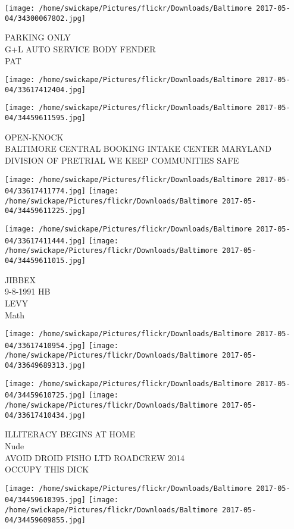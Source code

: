 \documentclass[10pt,letterpaper]{article}
\begin{document}
\vspace{0.25in}
\texttt{[image: /home/swickape/Pictures/flickr/Downloads/Baltimore 2017-05-04/34300067802.jpg]}

PARKING ONLY\\
G+L AUTO SERVICE BODY FENDER\\
PAT
\pagebreak

\texttt{[image: /home/swickape/Pictures/flickr/Downloads/Baltimore 2017-05-04/33617412404.jpg]}

\vspace{0.25in}
\texttt{[image: /home/swickape/Pictures/flickr/Downloads/Baltimore 2017-05-04/34459611595.jpg]}

OPEN{-}KNOCK\\
BALTIMORE CENTRAL BOOKING INTAKE CENTER MARYLAND DIVISION OF PRETRIAL WE KEEP COMMUNITIES SAFE
\pagebreak

\texttt{[image: /home/swickape/Pictures/flickr/Downloads/Baltimore 2017-05-04/33617411774.jpg]}
\texttt{[image: /home/swickape/Pictures/flickr/Downloads/Baltimore 2017-05-04/34459611225.jpg]}

\texttt{[image: /home/swickape/Pictures/flickr/Downloads/Baltimore 2017-05-04/33617411444.jpg]}
\texttt{[image: /home/swickape/Pictures/flickr/Downloads/Baltimore 2017-05-04/34459611015.jpg]}

JIBBEX\\
9{-}8{-}1991 HB\\
LEVY\\
Math
\pagebreak

\texttt{[image: /home/swickape/Pictures/flickr/Downloads/Baltimore 2017-05-04/33617410954.jpg]}
\texttt{[image: /home/swickape/Pictures/flickr/Downloads/Baltimore 2017-05-04/33649689313.jpg]}

\texttt{[image: /home/swickape/Pictures/flickr/Downloads/Baltimore 2017-05-04/34459610725.jpg]}
\texttt{[image: /home/swickape/Pictures/flickr/Downloads/Baltimore 2017-05-04/33617410434.jpg]}

ILLITERACY BEGINS AT HOME\\
Nude\\
AVOID DROID FISHO LTD ROADCREW 2014\\
OCCUPY THIS DICK
\pagebreak

\texttt{[image: /home/swickape/Pictures/flickr/Downloads/Baltimore 2017-05-04/34459610395.jpg]}
\texttt{[image: /home/swickape/Pictures/flickr/Downloads/Baltimore 2017-05-04/34459609855.jpg]}
\end{document}
